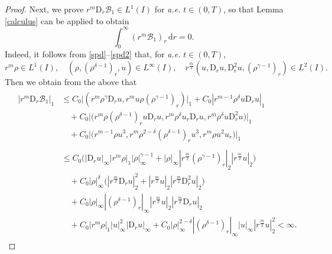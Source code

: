 \documentclass[11pt,reqno]{amsart}
\numberwithin{rk}{section}
\numberwithin{prop}{section}
\numberwithin{mydef}{section}
\numberwithin{lem}{section}
\numberwithin{equation}{section}
\numberwithin{thm}{section}
\begin{document}
\begin{proof}
Next, we prove $r^m \mathrm{D}_r \mathcal{B}_1 \in L^1(I)$ for \textit{a.e.} $t\in (0,T)$, so that Lemma \ref{calculus} can be applied to obtain
\begin{equation}\label{int-B1}
\int_0^\infty (r^m\mathcal{B}_1)_r\,\mathrm{d}r=0.
\end{equation}
Indeed, it follows from \eqref{spd}--\eqref{spd2} that, for \textit{a.e.} $t\in (0,T)$,
\begin{equation*}
r^m\rho\in L^1(I),\quad (\rho,(\rho^{\delta-1})_r,u)\in L^\infty(I),\quad r^\frac{m}{2}(u,\mathrm{D}_r u,\mathrm{D}_r^2 u,(\rho^{\gamma-1})_r)\in L^2(I).
\end{equation*}
Then we obtain from the above that
\begin{align*}
&\begin{aligned}
|r^m \mathrm{D}_r \mathcal{B}_1|_1&\leq C_0\big|(r^{m}\rho^\gamma \mathrm{D}_r u,r^mu \rho(\rho^{\gamma-1})_r)\big|_1+C_0|r^{m-1}\rho^{\delta}u\mathrm{D}_r u|_1\\
&\quad +C_0\big|\big(r^m\rho(\rho^{\delta-1})_ru\mathrm{D}_r u,r^m\rho^{\delta} u_r\mathrm{D}_r u,r^m\rho^{\delta} u\mathrm{D}_r^2 u\big)\big|_1\\
&\quad+C_0\big|\big(r^{m-1}\rho u^3,r^m\rho^{2-\delta}(\rho^{\delta-1})_ru^3,r^m\rho u^2u_r\big)\big|_1
\end{aligned}\\ 
&\qquad\qquad \ \ \begin{aligned}
&\leq C_0\big(|\mathrm{D}_r u|_\infty|r^m\rho|_1|\rho|_\infty^{\gamma-1}+|\rho|_\infty|r^\frac{m}{2}(\rho^{\gamma-1})_r|_2|r^\frac{m}{2}u|_2\big)\\
&\quad +C_0|\rho|_\infty^{\delta} \big(|r^\frac{m}{2}\mathrm{D}_r u|_2^2+|r^\frac{m}{2}u|_2 |r^\frac{m}{2}\mathrm{D}_r^2 u|_2\big)\\
&\quad +C_0|\rho|_\infty|(\rho^{\delta-1})_r|_\infty|r^\frac{m}{2}u|_2 |r^\frac{m}{2}\mathrm{D}_r u|_2\\
&\quad +C_0|r^m\rho|_1|u|_\infty^2 |\mathrm{D}_r u|_\infty+C_0|\rho|_\infty^{2-\delta}|(\rho^{\delta-1})_r|_\infty|u|_\infty|r^\frac{m}{2}u|_2^2<\infty.
\end{aligned}
\end{align*}


\end{proof}
\end{document}
